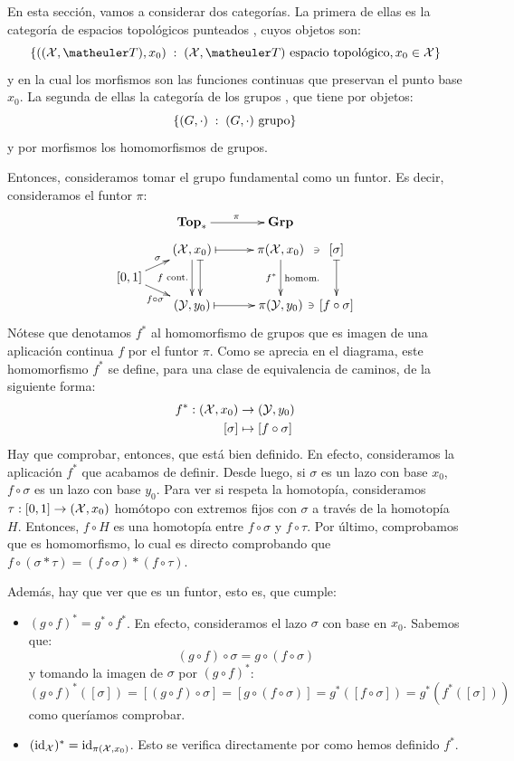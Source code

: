 \begin{const}
	En esta sección, vamos a considerar dos categorías. La primera de ellas es la categoría de espacios topológicos punteados \Topp, cuyos objetos son: 
	\[\{((\X,\T),x_0)\midc (\X,\T)\text{ espacio topológico}, x_0\in\X\}\]
	y en la cual los morfismos son las funciones continuas que preservan el punto base $x_0$. La segunda de ellas la categoría de los grupos \Grp, que tiene por objetos:
	\[\{(G,\cdot)\;:\; (G,\cdot) \text{ grupo}\}\]
	y por morfismos los homomorfismos de grupos.
	
	Entonces, consideramos tomar el grupo fundamental como un funtor. Es decir, consideramos el funtor $\pi$:
	\[\xymatrix @R=0.5pc @C=0.5pc {
		& & \Topp \ar[rrr]^\pi & & & \Grp & \\
		& & (\X,x_0) \ar@{|->}[rrr] \ar[dd]_{f \text{ cont.}} \ar@<1.5ex>@{|->}[dd] & & & \pi(\X,x_0) \ar[dd]_{f^\ast}^{\text{homom.}} \ar@{}[r]|-\ni & [\sigma] \ar@{|->}[dd] \\
		[0,1] \ar[urr]^\sigma \ar[drr]_{f\circ\sigma} & & & & & & \\
		& & (\Y,y_0) \ar@{|->}[rrr] & & & \pi(\Y,y_0) \ar@{}[r]|-\ni & [f\circ\sigma] \\
	}\]
	Nótese que denotamos $f^\ast$ al homomorfismo de grupos que es imagen de una aplicación continua $f$ por el funtor $\pi$.
	Como se aprecia en el diagrama, este homomorfismo $f^\ast$ se define, para una clase de equivalencia de caminos, de la siguiente forma:
	\[\begin{split}
	f^\ast:(\mathcal{X}, x_0) &\to (\mathcal{Y}, y_0) \\
	[\sigma] &\mapsto [f\circ\sigma]
	\end{split}\]
	Hay que comprobar, entonces, que está bien definido. En efecto, consideramos la aplicación $f^\ast$ que acabamos de definir. Desde luego, si $\sigma$ es un lazo con base $x_0$, $f\circ\sigma$ es un lazo con base $y_0$. Para ver si respeta la homotopía, consideramos $\tau:[0,1]\to (\mathcal{X},x_0)$ homótopo con extremos fijos con $\sigma$ a través de la homotopía $H$. Entonces, $f\circ H$ es una homotopía entre $f\circ\sigma$ y $f\circ\tau$. Por último, comprobamos que es homomorfismo, lo cual es directo comprobando que $f\circ(\sigma\ast\tau)=(f\circ\sigma)\ast (f\circ\tau)$.
	
	Además, hay que ver que es un funtor, esto es, que cumple:
	\begin{itemize}
		\item $(g\circ f)^\ast = g^\ast\circ f^\ast$. En efecto, consideramos el lazo $\sigma$ con base en $x_0$. Sabemos que:
		\[(g\circ f)\circ\sigma=g\circ(f\circ\sigma)\]
		y tomando la imagen de $\sigma$ por $(g\circ f)^\ast$:
			\[(g\circ f)^\ast([\sigma])=[(g\circ f)\circ\sigma]=[g\circ(f\circ\sigma)]=g^\ast([f\circ\sigma])=g^\ast(f^\ast([\sigma]))\]
		como queríamos comprobar.
		
		\item $(\operatorname{\mathrm{id}}_{\mathcal{X}})^\ast = \operatorname{\mathrm{id}}_{\pi(\mathcal{X}, x_0)}$. Esto se verifica directamente por como hemos definido $f^\ast$.
	\end{itemize}
\end{const}

